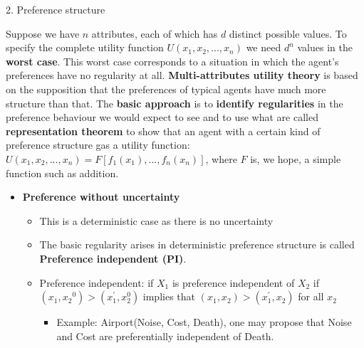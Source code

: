 \documentclass[12pt]{article}
\begin{document}
2. Preference structure
\begin{tcolorbox}
Suppose we have $n$ attributes, each of which has $d$ distinct possible values. To specify the complete utility function $U(x_1, x_2, ..., x_n)$ we need \textbf{$d^n$} values in the \textbf{worst case}. This worst case corresponds to a situation in which the agent's preferences have no regularity at all. \textbf{Multi-attributes utility theory} is based on the supposition that the preferences of typical agents have much more structure than that. The \textbf{basic approach} is to \textbf{identify regularities} in the preference behaviour we would expect to see and to use what are called \textbf{representation theorem} to show that an agent with a certain kind of preference structure gas a utility function: $U(x_1, x_2, ..., x_n) = F[f_1(x_1), ..., f_n(x_n)]$, where $F$ is, we hope, a simple function such as addition. 
\begin{itemize}
\item \textbf{Preference without uncertainty}
\begin{itemize}
\item This is a deterministic case as there is no uncertainty
\item The basic regularity arises in deterministic preference structure is called \textbf{Preference independent (PI)}.
\item Preference independent: if $X_1$ is preference independent  of $X_2$ if 
 $(x_{1}, {x_{2}}^{0}) > (x_{1}^{'}, x_{2}^{0})$ implies that $(x_{1}, {x_{2}}) > (x_{1}^{'}, x_{2})$ for all $x_2$
 \begin{itemize}
 \item Example: Airport(Noise, Cost, Death), one may propose that Noise and Cost are preferentially independent of Death. 
 \end{itemize}
 
\end{itemize}
\end{itemize}
\end{tcolorbox}
\end{document}
